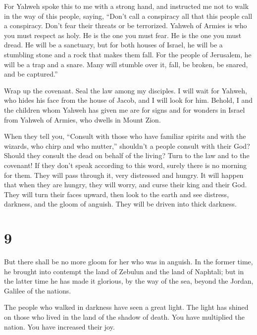  For Yahweh spoke this to me with a strong hand, and
instructed me not to walk in the way of this people, saying,
 ``Don't call a conspiracy all that this people call a
conspiracy. Don't fear their threats or be terrorized. 
Yahweh of Armies is who you must respect as holy. He is the one you must
fear. He is the one you must dread.  He will be a
sanctuary, but for both houses of Israel, he will be a stumbling stone
and a rock that makes them fall. For the people of Jerusalem, he will be
a trap and a snare.  Many will stumble over it, fall, be
broken, be snared, and be captured.''

 Wrap up the covenant. Seal the law among my disciples.
 I will wait for Yahweh, who hides his face from the house
of Jacob, and I will look for him.  Behold, I and the
children whom Yahweh has given me are for signs and for wonders in
Israel from Yahweh of Armies, who dwells in Mount Zion.

 When they tell you, ``Consult with those who have familiar
spirits and with the wizards, who chirp and who mutter,'' shouldn't a
people consult with their God? Should they consult the dead on behalf of
the living?  Turn to the law and to the covenant! If they
don't speak according to this word, surely there is no morning for them.
 They will pass through it, very distressed and hungry. It
will happen that when they are hungry, they will worry, and curse their
king and their God. They will turn their faces upward, 
then look to the earth and see distress, darkness, and the gloom of
anguish. They will be driven into thick darkness.

\hypertarget{section-8}{%
\section{9}\label{section-8}}

 But there shall be no more gloom for her who was in
anguish. In the former time, he brought into contempt the land of
Zebulun and the land of Naphtali; but in the latter time he has made it
glorious, by the way of the sea, beyond the Jordan, Galilee of the
nations.

 The people who walked in darkness have seen a great light.
The light has shined on those who lived in the land of the shadow of
death.  You have multiplied the nation. You have increased
their joy.

